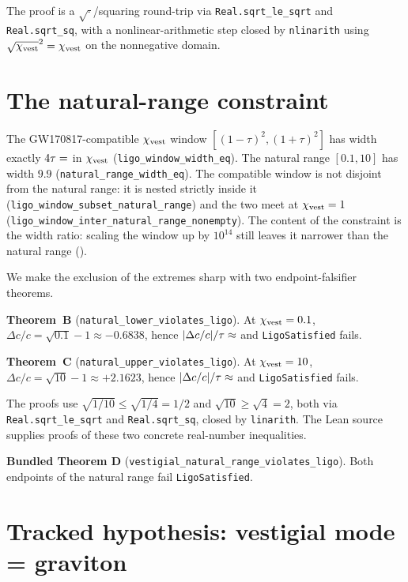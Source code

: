 \documentclass[aps,prd,twocolumn,showpacs,superscriptaddress,nofootinbib]{revtex4-2}
\newcommand{\chivest}{\chi_{\rm vest}}
\newcommand{\dccap}{\Delta c/c}
\begin{document}
The proof is a $\sqrt{\cdot}$/squaring round-trip via
\verb|Real.sqrt_le_sqrt| and \verb|Real.sqrt_sq|, with a
nonlinear-arithmetic step closed by \verb|nlinarith| using
$\sqrt{\chivest}^{2} = \chivest$ on the nonnegative domain.

\section{The natural-range constraint}
\label{sec:falsification}

The GW170817-compatible $\chivest$ window
$[(1-\tau)^{2}, (1+\tau)^{2}]$ has width exactly $4\tau =
\unskip$ in $\chivest$
(\verb|ligo_window_width_eq|). The natural range
$[0.1, 10]$ has width $9.9$ (\verb|natural_range_width_eq|). The
compatible window is not disjoint from the natural range: it is
nested strictly inside it
(\verb|ligo_window_subset_natural_range|) and the two meet at
$\chivest = 1$ (\verb|ligo_window_inter_natural_range_nonempty|).
The content of the constraint is the width ratio: scaling the
window up by $10^{14}$ still leaves it narrower than the natural
range ().

We make the exclusion of the extremes sharp with two
endpoint-falsifier theorems.

\textbf{Theorem~B} (\verb|natural_lower_violates_ligo|). At
$\chivest = 0.1$, $\dccap = \sqrt{0.1} - 1 \approx -0.6838$,
hence $|\dccap|/\tau \approx \unskip$ and
\verb|LigoSatisfied| fails.

\textbf{Theorem~C} (\verb|natural_upper_violates_ligo|). At
$\chivest = 10$, $\dccap = \sqrt{10} - 1 \approx +2.1623$,
hence $|\dccap|/\tau \approx \unskip$ and
\verb|LigoSatisfied| fails.

The proofs use $\sqrt{1/10} \leq \sqrt{1/4} = 1/2$ and
$\sqrt{10} \geq \sqrt{4} = 2$, both via \verb|Real.sqrt_le_sqrt|
and \verb|Real.sqrt_sq|, closed by \verb|linarith|. The Lean source supplies proofs of these two concrete
real-number inequalities.

\textbf{Bundled Theorem D} (\verb|vestigial_natural_range_violates_ligo|).
Both endpoints of the natural range fail \verb|LigoSatisfied|.

\section{Tracked hypothesis: vestigial mode = graviton}
\label{sec:tracked-hyp}
\end{document}
